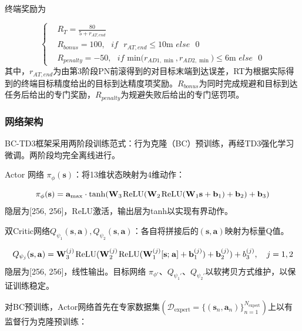终端奖励为

\begin{equation}
\label{eq:75}
\left\{
\begin{aligned}
& {R_T} = \frac{{80}}{{5 + {r_{AT,end}}}} \\
& {R_{bonus}} = 100,{\text{ }}if{\text{ }}{r_{AT,end}} \leqslant 10{\text{m }}else{\text{ }}0 \\
& {R_{penalty}} =  - 50,{\text{ }}if{\text{ min(}}{r_{AD1,\min }},{r_{AD2,\min }}{\text{)}} \leqslant 6{\text{m }}else{\text{ }}0
\end{aligned}
\right.
\end{equation}
其中，${r_{AT,end}}$为由第3阶段PN前滚得到的对目标末端到达误差，RT为根据实际得到的终端目标精度给出的目标到达精度项奖励。${R_{bonus}}$为同时完成规避和目标到达任务后给出的专门奖励，${R_{penalty}}$为规避失败后给出的专门惩罚项。

\subsubsection{网络架构}
BC-TD3框架采用两阶段训练范式：行为克隆（BC）预训练，再经TD3强化学习微调。两阶段均完全离线进行。

Actor 网络 ${\pi _\phi }({\mathbf{s}})$：将13维状态映射为4维动作：

\begin{equation}
\label{eq:76}
{\pi _\phi }({\mathbf{s}}) = {{\mathbf{a}}_{\max }} \cdot \tanh ({{\mathbf{W}}_3}{\kern 1pt} {\text{ReLU}}({{\mathbf{W}}_2}{\kern 1pt} {\text{ReLU}}({{\mathbf{W}}_1}{\mathbf{s}} + {{\mathbf{b}}_1}) + {{\mathbf{b}}_2}) + {{\mathbf{b}}_3})
\end{equation}
隐层为[256, 256]，ReLU激活，输出层为tanh以实现有界动作。

双Critic网络${Q_{{\psi _1}}}({\mathbf{s}},{\mathbf{a}}),{Q_{{\psi _2}}}({\mathbf{s}},{\mathbf{a}})$：各自将拼接后的$({\mathbf{s}},{\mathbf{a}})$映射为标量Q值。

\begin{equation}
\label{eq:77}
{Q_{{\psi _j}}}({\mathbf{s}},{\mathbf{a}}) = {\mathbf{W}}_3^{(j)}{\kern 1pt} {\text{ReLU}}({\mathbf{W}}_2^{(j)}{\kern 1pt} {\text{ReLU}}({\mathbf{W}}_1^{(j)}[{\mathbf{s}};{\kern 1pt} {\mathbf{a}}] + {\mathbf{b}}_1^{(j)}) + {\mathbf{b}}_2^{(j)}) + b_3^{(j)},\quad j = 1,2
\end{equation}
隐层为[256, 256]，线性输出。目标网络 \(\pi_{\phi'}\)、\(Q_{\psi_1'}\)、\(Q_{\psi_2'}\)以软拷贝方式维护，以保证训练稳定。

对BC预训练，Actor网络首先在专家数据集$({\mathcal{D}_{{\text{expert}}}} = \{ ({{\mathbf{s}}_n},{{\mathbf{a}}_n})\} _{n = 1}^{{N_{{\text{expert}}}}})$上以有监督行为克隆预训练：

